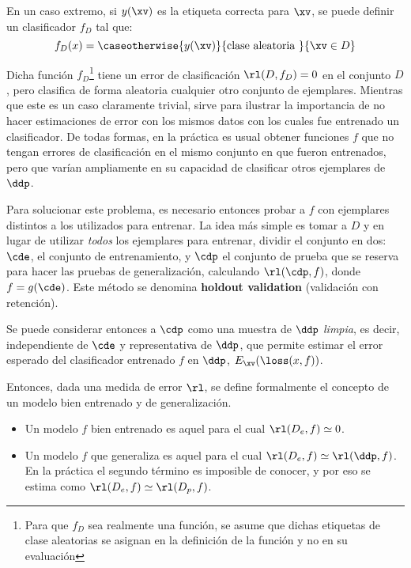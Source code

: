 En un caso extremo, si $y(\xv)$ es la etiqueta correcta para $\xv$, se puede definir un clasificador $f_D$ tal que:
\begin{equation}
  f_D(x)=\caseotherwise{y(\xv)}{\text{clase aleatoria }}{\xv \in D}
\end{equation}

Dicha función $f_D$\footnote{Para que $f_D$ sea realmente una función, se asume que dichas etiquetas de clase aleatorias se asignan en la definición de la función y no en su evaluación}  tiene un error de clasificación $\rl(D,f_D)=0$ en el conjunto $D$, pero clasifica de forma aleatoria cualquier otro conjunto de ejemplares. Mientras que este es un caso claramente trivial, sirve para ilustrar la importancia de no hacer estimaciones de error con los mismos datos con los cuales fue entrenado un clasificador. De todas formas, en la práctica es usual obtener funciones $f$ que no tengan errores de clasificación en el mismo conjunto en que fueron entrenados, pero que varían ampliamente en su capacidad de clasificar otros ejemplares de $\ddp$. 

Para solucionar este problema, es necesario entonces probar a $f$ con ejemplares distintos a los utilizados para entrenar. La idea más simple es tomar a $D$ y en lugar de utilizar \textit{todos} los ejemplares para entrenar, dividir el conjunto en dos: $\cde$, el conjunto de entrenamiento, y $\cdp$ el conjunto de prueba que se reserva para hacer las pruebas de generalización, calculando $\rl(\cdp,f)$, donde $f=g(\cde)$. Este método se denomina \textbf{holdout validation} (validación con retención). 


Se puede considerar entonces a $\cdp$ como una muestra de $\ddp$ \textit{limpia}, es decir, independiente de $\cde$ y representativa de $\ddp$, que permite estimar el error esperado del clasificador entrenado $f$ en $\ddp$, $E_{\xv}(\loss(x,f))$.

Entonces, dada una medida de error $\rl$, se define formalmente el concepto de un modelo bien entrenado y de generalización. 

\begin{itemize}
\item Un modelo $f$ bien entrenado es aquel para el cual $\rl(D_e,f) \simeq 0$.
\item Un modelo $f$ que generaliza es aquel para el cual  $\rl(D_e,f) \simeq \rl(\ddp,f)$. En la práctica el segundo término es imposible de conocer, y por eso se estima como $\rl(D_e,f) \simeq \rl(D_p,f)$.
\end{itemize}

